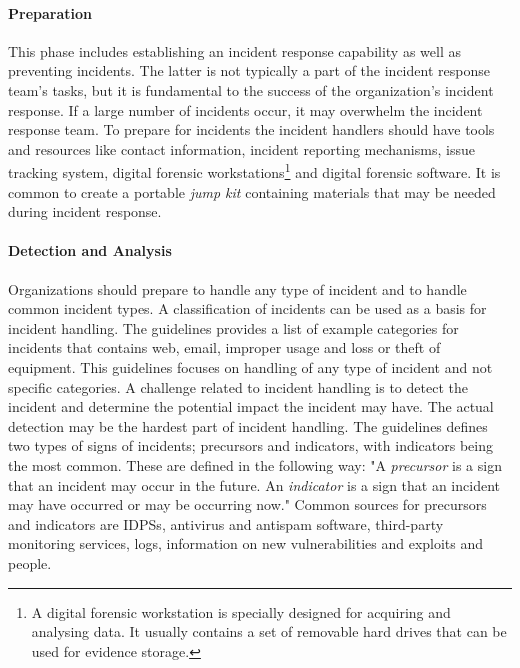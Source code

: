 \paragraph{Preparation} 
This phase includes establishing an incident response capability as well as preventing incidents. The latter is not typically a part of the incident response team's tasks, but it is fundamental to the success of the organization's incident response. If a large number of incidents occur, it may overwhelm the incident response team. To prepare for incidents the incident handlers should have tools and resources like contact information, incident reporting mechanisms, issue tracking system, digital forensic workstations\footnote{A digital forensic workstation is specially designed for acquiring and analysing data. It usually contains a set of removable hard drives that can be used for evidence storage.} and digital forensic software. It is common to create a portable \emph{jump kit} containing materials that may be needed during incident response.

\paragraph{Detection and Analysis}
Organizations should prepare to handle any type of incident and to handle common incident types. A classification of incidents can be used as a basis for incident handling. The guidelines provides a list of example categories for incidents that contains web, email, improper usage and loss or theft of equipment. This guidelines focuses on handling of any type of incident and not specific categories. A challenge related to incident handling is to detect the incident and determine the potential impact the incident may have. The actual detection may be the hardest part of incident handling. The guidelines defines two types of signs of incidents; precursors and indicators, with indicators being the most common. These are defined in the following way: "A \emph{precursor} is a sign that an incident may occur in the future. An \emph{indicator} is a sign that an incident may have occurred or may be occurring now." Common sources for precursors and indicators are \acp{IDPS}, antivirus and antispam software, third-party monitoring services, logs, information on new vulnerabilities and exploits and people. 


